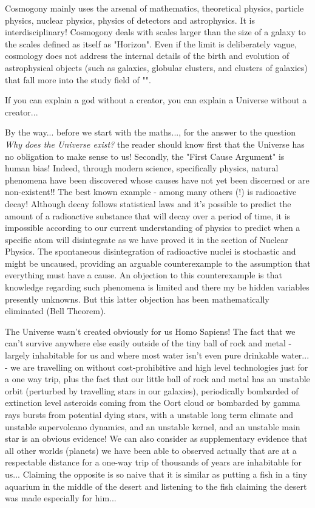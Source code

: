 	Cosmogony mainly uses the arsenal of mathematics, theoretical physics, particle physics, nuclear physics, physics of detectors and astrophysics. It is interdisciplinary! Cosmogony deals with scales larger than the size of a galaxy to the scales defined as itself as "Horizon". Even if the limit is deliberately vague, cosmology does not address the internal details of the birth and evolution of astrophysical objects (such as galaxies, globular clusters, and clusters of galaxies) that fall more into the study field of "".
	\begin{fquote}If you can explain a god without a creator, you can explain a Universe without a creator...
 	\end{fquote}
	By the way... before we start with the maths..., for the answer to the question \textit{Why does the Universe exist?} the reader should know first that the Universe has no obligation to make sense to us! Secondly, the "First Cause Argument" is human bias! Indeed, through modern science, specifically physics, natural phenomena have been discovered whose causes have not yet been discerned or are non-existent!! The best known example - among many others (!) is radioactive decay! Although decay follows statistical laws and it's possible to predict the amount of a radioactive substance that will decay over a period of time, it is impossible according to our current understanding of physics to predict when a specific atom will disintegrate as we have proved it in the section of Nuclear Physics. The spontaneous disintegration of radioactive nuclei is stochastic and might be uncaused, providing an arguable counterexample to the assumption that everything must have a cause.  An objection to this counterexample is that knowledge regarding such phenomena is limited and there my be hidden variables presently unknowns. But this latter objection has been mathematically eliminated (Bell Theorem).
	
	The Universe wasn't created obviously for us Homo Sapiens! The fact that we can't survive anywhere else easily outside of the tiny ball of rock and metal - largely inhabitable for us and where most water isn't even pure drinkable water... -  we are travelling on without cost-prohibitive and high level technologies just for a one way trip, plus the fact that our little ball of rock and metal has an unstable orbit (perturbed by travelling stars in our galaxies), periodically bombarded of extinction level asteroids coming from the Oort cloud or bombarded by gamma rays bursts from potential dying stars, with a unstable long term climate and unstable supervolcano dynamics, and an unstable kernel, and an unstable main star is an obvious evidence! We can also consider as supplementary evidence that all other worlds (planets) we have been able to observed actually that are at a respectable distance for a one-way trip of thousands of years are inhabitable for us... Claiming the opposite is so naive that it is similar as putting a fish in a tiny aquarium in the middle of the desert and listening to the fish claiming the desert was made especially for him...
	
